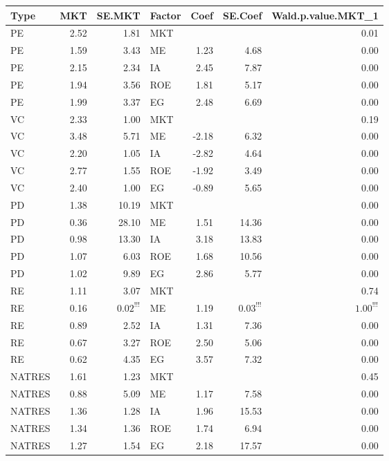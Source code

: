 \documentclass[12pt]{article}
\begin{document}
\begin{table}[ht]
	\centering
	\begin{tabular}{lrrlrrr}
		Type & MKT & SE.MKT & Factor & Coef & SE.Coef & Wald.p.value.MKT\_1 \\ 
		\hline
		\hline
		PE & 2.52 & 1.81 & MKT &  &  & 0.01 \\ 
		PE & 1.59 & 3.43 & ME & 1.23 & 4.68 & 0.00 \\ 
		PE & 2.15 & 2.34 & IA & 2.45 & 7.87 & 0.00 \\ 
		PE & 1.94 & 3.56 & ROE & 1.81 & 5.17 & 0.00 \\ 
		PE & 1.99 & 3.37 & EG & 2.48 & 6.69 & 0.00 \\ 
		\hline
		VC & 2.33 & 1.00 & MKT &  &  & 0.19 \\ 
		VC & 3.48 & 5.71 & ME & -2.18 & 6.32 & 0.00 \\ 
		VC & 2.20 & 1.05 & IA & -2.82 & 4.64 & 0.00 \\ 
		VC & 2.77 & 1.55 & ROE & -1.92 & 3.49 & 0.00 \\ 
		VC & 2.40 & 1.00 & EG & -0.89 & 5.65 & 0.00 \\ 
		\hline
		PD & 1.38 & 10.19 & MKT &  &  & 0.00 \\ 
		PD & 0.36 & 28.10 & ME & 1.51 & 14.36 & 0.00 \\ 
		PD & 0.98 & 13.30 & IA & 3.18 & 13.83 & 0.00 \\ 
		PD & 1.07 & 6.03 & ROE & 1.68 & 10.56 & 0.00 \\ 
		PD & 1.02 & 9.89 & EG & 2.86 & 5.77 & 0.00 \\ 
		\hline
		RE & 1.11 & 3.07 & MKT &  &  & 0.74 \\ 
		RE & 0.16 & $0.02^{!!!}$ & ME & 1.19 & $0.03^{!!!}$ & $1.00^{!!!}$ \\ 
		RE & 0.89 & 2.52 & IA & 1.31 & 7.36 & 0.00 \\ 
		RE & 0.67 & 3.27 & ROE & 2.50 & 5.06 & 0.00 \\ 
		RE & 0.62 & 4.35 & EG & 3.57 & 7.32 & 0.00 \\ 
		\hline
		NATRES & 1.61 & 1.23 & MKT &  &  & 0.45 \\ 
		NATRES & 0.88 & 5.09 & ME & 1.17 & 7.58 & 0.00 \\ 
		NATRES & 1.36 & 1.28 & IA & 1.96 & 15.53 & 0.00 \\ 
		NATRES & 1.34 & 1.36 & ROE & 1.74 & 6.94 & 0.00 \\ 
		NATRES & 1.27 & 1.54 & EG & 2.18 & 17.57 & 0.00 \\ 

\end{tabular}
\end{table}
\end{document}

